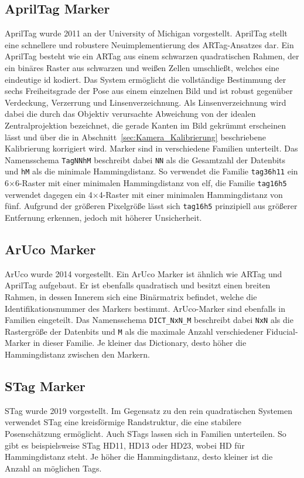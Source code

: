 \subsection*{AprilTag Marker}
\label{sec:april_tag}
AprilTag wurde 2011 an der University of Michigan vorgestellt.
AprilTag stellt eine schnellere und robustere Neuimplementierung des ARTag-Ansatzes dar.
Ein AprilTag besteht wie ein ARTag aus einem schwarzen quadratischen Rahmen, der ein 
binäres Raster aus schwarzen und weißen Zellen umschließt, welches eine eindeutige \gls{id} kodiert.
Das System ermöglicht die vollständige Bestimmung der sechs Freiheitsgrade der Pose aus einem einzelnen Bild und ist robust gegenüber Verdeckung, 
Verzerrung und Linsenverzeichnung.
Als Linsenverzeichnung wird dabei die durch das Objektiv verursachte Abweichung von der idealen Zentralprojektion bezeichnet, die gerade Kanten im Bild gekrümmt erscheinen lässt 
und über die in Abschnitt~\ref{sec:Kamera_Kalibrierung} beschriebene Kalibrierung korrigiert wird.
Marker sind in verschiedene Familien unterteilt. 
Das Namensschema \texttt{TagNNhM} beschreibt dabei \texttt{NN} als die Gesamtzahl der 
Datenbits und \texttt{hM} als die minimale Hammingdistanz.
So verwendet die Familie \texttt{tag36h11} ein 6$\times$6-Raster mit einer minimalen Hammingdistanz von elf, die Familie \texttt{tag16h5} 
verwendet dagegen ein 4$\times$4-Raster mit einer minimalen Hammingdistanz von fünf.
Aufgrund der größeren Pixelgröße lässt sich \texttt{tag16h5} prinzipiell aus größerer Entfernung erkennen, jedoch mit höherer Unsicherheit.~\cite{Olson5979561,Bradski2008}


\subsection*{ArUco Marker}
ArUco wurde 2014 vorgestellt.
Ein ArUco Marker ist ähnlich wie ARTag und AprilTag aufgebaut.
Er ist ebenfalls quadratisch und besitzt einen breiten Rahmen, in dessen Innerem sich eine Binärmatrix befindet, welche die Identifikationsnummer 
des Markers bestimmt.
ArUco-Marker sind ebenfalls in Familien eingeteilt. 
Das Namensschema \texttt{DICT\_NxN\_M} beschreibt dabei \texttt{NxN} als die Rastergröße 
der Datenbits und \texttt{M} als die maximale Anzahl verschiedener Fiducial-Marker in dieser Familie.
Je kleiner das Dictionary, desto höher die Hammingdistanz zwischen den Markern.~\cite{GARRIDOJURADO20142280}


\subsection*{STag Marker}
STag wurde 2019 vorgestellt.
Im Gegensatz zu den rein quadratischen Systemen verwendet STag eine kreisförmige Randstruktur, die eine stabilere Posenschätzung 
ermöglicht.
Auch STags lassen sich in Familien unterteilen.
So gibt es beispielsweise STag HD11, HD13 oder HD23, wobei HD für Hammingdistanz steht.
Je höher die Hammingdistanz, desto kleiner ist die Anzahl an möglichen Tags.~\cite{Benligiray2019}




